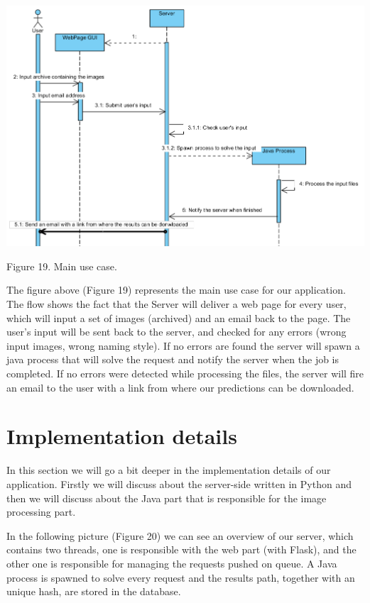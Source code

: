 \documentclass[12pt, a4paper]{report}
\begin{document}
\bigskip
\includegraphics[scale=0.7, center]{FlowCase.png}
\begin{center}
Figure 19. Main use case.
\end{center}
\par 

The figure above (Figure 19) represents the main use case for our application. The flow shows the fact that the Server will deliver a web page for every user, which will input a set of images (archived) and an email back to the page. The user's input will be sent back to the server, and checked for any errors (wrong input images, wrong naming style). If no errors are found the server will spawn a java process that will solve the request and notify the server when the job is completed. If no errors were detected while processing the files, the server will fire an email to the user with a link from where our predictions can be downloaded.


\section{Implementation details}
\quad
In this section we will go a bit deeper in the implementation details of our application. Firstly we will discuss about the server-side written in Python and then we will discuss about the Java part that is responsible for the image processing part.
\par 

In the following picture (Figure 20) we can see an overview of our server, which contains two threads, one is responsible with the web part (with Flask), and the other one is responsible for managing the requests pushed on queue. A Java process is spawned to solve every request and the results path, together with an unique hash, are stored in the database.
\par 
\end{document}
